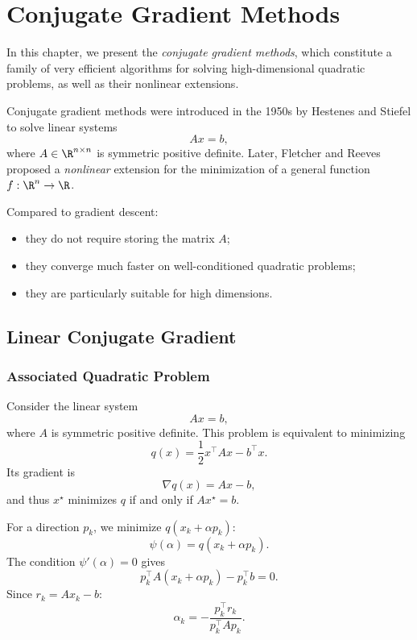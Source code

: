 \chapter{Conjugate Gradient Methods}

In this chapter, we present the \emph{conjugate gradient methods},
which constitute a family of very efficient algorithms for solving
high-dimensional quadratic problems, as well as their
nonlinear extensions.

Conjugate gradient methods were introduced in the
1950s by Hestenes and Stiefel \cite{hestenes1952methods} to solve linear systems
\[
A x = b,
\]
where $A \in \R^{n \times n}$ is symmetric positive definite. Later,
Fletcher and Reeves \cite{fletcher1964function} proposed a \emph{nonlinear} extension for
the minimization of a general function $f : \R^n \to \R$.

\medskip

Compared to gradient descent:
\begin{itemize}
  \item they do not require storing the matrix $A$;
  \item they converge much faster on well-conditioned quadratic problems;
  \item they are particularly suitable for high dimensions.
\end{itemize}

\section{Linear Conjugate Gradient}

\subsection{Associated Quadratic Problem}

Consider the linear system
\[
A x = b,
\]
where $A$ is symmetric positive definite. This problem is equivalent to minimizing
\begin{equation}
q(x) = \frac{1}{2} x^\top A x - b^\top x.
\label{eq:cg-quadratic}
\end{equation}
Its gradient is
\[
\nabla q(x) = A x - b,
\]
and thus $x^\star$ minimizes $q$ if and only if $A x^\star = b$.

For a direction $p_k$, we minimize $q(x_k + \alpha p_k)$:
\[
\psi(\alpha) = q(x_k + \alpha p_k).
\]
The condition $\psi'(\alpha)=0$ gives
\[
p_k^\top A (x_k + \alpha p_k) - p_k^\top b = 0.
\]
Since $r_k = A x_k - b$:
\[
\boxed{\alpha_k = -\frac{p_k^\top r_k}{p_k^\top A p_k}}.
\]

